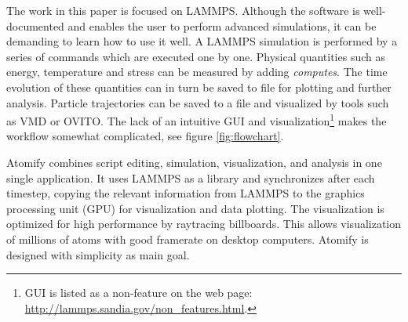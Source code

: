 \documentclass[aps,pre,twocolumn,letterpaper,floatfix,nofootinbib]{revtex4}
\begin{document}
The work in this paper is focused on LAMMPS.
Although the software is well-documented and enables the user to perform
advanced simulations, it can be demanding to learn how to use it well.
A LAMMPS simulation is performed by a series of commands which are executed one by
one.
Physical quantities such as energy, temperature and stress can be measured by
adding \textit{computes}.
The time evolution of these quantities can in turn be saved to file for plotting
and further analysis.
Particle trajectories can be saved to a file and visualized by tools such as
VMD\citep{Humphrey1996Vmd} or OVITO\citep{Stukowski2009Visualization}.
The lack of an intuitive GUI and visualization\footnote{GUI is listed as a non-feature on the web page:
\url{http://lammps.sandia.gov/non_features.html}.} makes the workflow somewhat
complicated, see figure \ref{fig:flowchart}.

Atomify combines script editing, simulation,
visualization, and analysis in one single application.
It uses LAMMPS as a library and synchronizes after each timestep,
copying the relevant information from LAMMPS to the graphics processing unit
(GPU) for visualization and data plotting.
The visualization is optimized for high performance by raytracing billboards.
This allows visualization of millions of atoms with good framerate on desktop
computers. Atomify is designed with simplicity as main goal.
\end{document}

